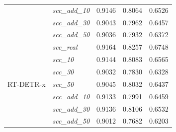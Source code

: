 \begin{table}[h!]
{\begin{tabular}{l|l|c|c|c}
                                      & \textit{scc\_add\_10}   & 0.9146                    & 0.8064                     & 0.6526                    \\
                                      & \textit{scc\_add\_30}   & 0.9043                    & 0.7962                     & 0.6457                    \\
                                      & \textit{scc\_add\_50}   & 0.9036                    & 0.7932                     & 0.6372                    \\
        \midrule
        \multirow[t]{7}{*}{RT-DETR-x} & \textit{scc\_real} & \cellcolor{blue!10}0.9164  & \cellcolor{blue!10}0.8257 & \cellcolor{blue!10}0.6748     \\
                                      & \textit{scc\_10}   & 0.9144                     & 0.8083                    & 0.6565                    \\
                                      & \textit{scc\_30}   & 0.9032                     & 0.7830                    & 0.6328                    \\
                                      & \textit{scc\_50}   & 0.9045                     & 0.8032                    & 0.6437                    \\
                                      & \textit{scc\_add\_10}   & 0.9133                    & 0.7991                     & 0.6459                    \\
                                      & \textit{scc\_add\_30}   & 0.9136                    & 0.8106                     & 0.6532                    \\
                                      & \textit{scc\_add\_50}   & 0.9012                    & 0.7682                     & 0.6203                    \\
        \bottomrule
    \end{tabular}%
    }
\end{table}



